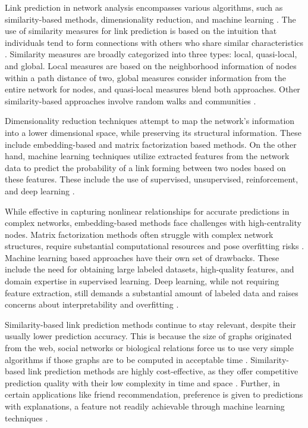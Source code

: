 Link prediction in network analysis encompasses various algorithms, such as similarity-based methods, dimensionality reduction, and machine learning \cite{arrar2023comprehensive}. The use of similarity measures for link prediction is based on the intuition that individuals tend to form connections with others who share similar characteristics \cite{wang2014link}. Similarity measures are broadly categorized into three types: local, quasi-local, and global. Local measures are based on the neighborhood information of nodes within a path distance of two, global measures consider information from the entire network for nodes, and quasi-local measures blend both approaches. Other similarity-based approaches involve random walks and communities \cite{arrar2023comprehensive}.

Dimensionality reduction techniques \cite{coskun2015link} attempt to map the network's information into a lower dimensional space, while preserving its structural information. These include embedding-based and matrix factorization based methods. On the other hand, machine learning techniques utilize extracted features from the network data to predict the probability of a link forming between two nodes based on these features. These include the use of supervised, unsupervised, reinforcement, and deep learning \cite{cui2018survey, arrar2023comprehensive}.

While effective in capturing nonlinear relationships for accurate predictions in complex networks, embedding-based methods face challenges with high-centrality nodes. Matrix factorization methods often struggle with complex network structures, require substantial computational resources and pose overfitting risks \cite{arrar2023comprehensive, martinez2016survey}. Machine learning based approaches have their own set of drawbacks. These include the need for obtaining large labeled datasets, high-quality features, and domain expertise in supervised learning. Deep learning, while not requiring feature extraction, still demands a substantial amount of labeled data and raises concerns about interpretability and overfitting \cite{cui2018survey}.

Similarity-based link prediction methods continue to stay relevant, despite their usually lower prediction accuracy. This is because the size of graphs originated from the web, social networks or biological relations force us to use very simple algorithms if those graphs are to be computed in acceptable time \cite{garcia2014link}. Similarity-based link prediction methods are highly cost-effective, as they offer competitive prediction quality with their low complexity in time and space \cite{zhou2021progresses}. Further, in certain applications like friend recommendation, preference is given to predictions with explanations, a feature not readily achievable through machine learning techniques \cite{barbieri2014follow}.

